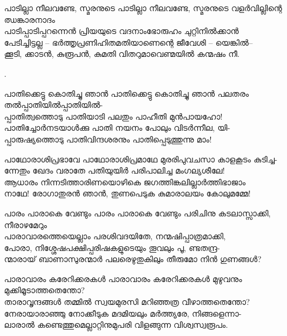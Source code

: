 \begin{enumerate}


\begin{slokam}{\VSr}{\PG}{പാടില്ലാ നീലവണ്ടേ, സ്മരനുടെ}
പാടില്ലാ നീലവണ്ടേ, സ്മരനുടെ വളർവില്ലിന്റെ ഝങ്കാരനാദം\\
പാടിപ്പാടിപ്പറന്നെൻ പ്രിയയുടെ വദനാംഭോരുഹം ചുറ്റിനിൽക്കാൻ\\
പേടിച്ചിട്ടല്ല -- ഭർത്തൃപ്രണിഹിതമതിയാണെന്റെ ജീവേശി -- യെങ്കിൽ--\\
ക്കൂടി, ക്കാടൻ, കുരൂപൻ, കുമതി വിതറുമാവെണ്മയിൽ കന്മഷം നീ.
\end{slokam}


.

\begin{slokam}{\VSv}{\KVIT}{പാതിക്കെട്ടു കൊതിച്ചു ഞാൻ}
പാതിക്കെട്ടു കൊതിച്ചു ഞാൻ പലതരം തൽപ്പാതിയിൽപ്പാതിയിൽ-\\
പ്പാതിത്വത്തൊടു പാതിയാടി പലതും പാഹീതി മുൻപായഹോ!\\
പാതിച്ചോർനടയാള്‍ക്കു പാതി നയനം പോലും വിടർന്നീല, യി-\\
പ്പാരുഷ്യത്തൊടു പാതിവിന്ദശരനും പാതിപ്പെടുത്തുന്നു മാം!
\end{slokam}



\begin{slokam}{\VSr}{\Unk}{പാഥോരാശിപ്രഭാവേ}
പാഥോരാശിപ്രമാഥേ മുരരിപുവചസാ കാളകൂടം കുടിച്ച-\\
ന്നേതും ഖേദം വരാതേ പതിയുയിർ പരിപാലിച്ച മംഗല്യശീലേ!  \\
ആധാരം നിന്നടിത്താരിണയൊഴികെ ജഗത്തിങ്കലില്ലാർത്തിഭാജാം \\
നാഥേ! രോഗാതുരൻ ഞാൻ, തുണപെടുക കുമാരാലയം കോലുമമ്മേ!
\end{slokam}


\begin{slokam}{\VSr}{\VNM}{പാരം പാരാകെ വേണ്ടും}
പാരം പാരാകെ വേണ്ടും പരിചിനു കടലാസ്സാക്കി, നീരാഴമേറും\\
പാരാവാരത്തെയെല്ലാം പരശിവദയിതേ, നന്മഷിപ്പാത്രമാക്കി,\\
പോരാ, നിശ്ശേഷപക്ഷിപ്പരിഷകളുടെയും തൂവലും പൂ, ണ്ടതന്ദ്ര-\\
ന്മാരായ്‌ ബാണാസുരന്മാർ പലരെഴുതുകിലും തീരുമോ നിൻ ഗുണങ്ങള്‍?
\end{slokam}


\begin{slokam}{\VSr}{\VCBP}{പാരാവാരം കരേറിക്കരകള്‍}
പാരാവാരം കരേറിക്കരകള്‍ മുഴുവനും മുക്കിമൂടാത്തതെന്തോ?\\
താരാവൃന്ദങ്ങള്‍ തമ്മിൽ സ്വയമുരസി മറിഞ്ഞത്ര വീഴാത്തതെന്തോ?\\
നേരായാരാഞ്ഞു നോക്കീടുക മദമിയലും മർത്ത്യരേ, നിങ്ങളെന്നാ-\\
ലാരാൽ കണ്ടെത്തുമെല്ലാറ്റിനുമുപരി വിളങ്ങുന്ന വിശ്വസ്വരൂപം.
\end{slokam}


\end{enumerate}
